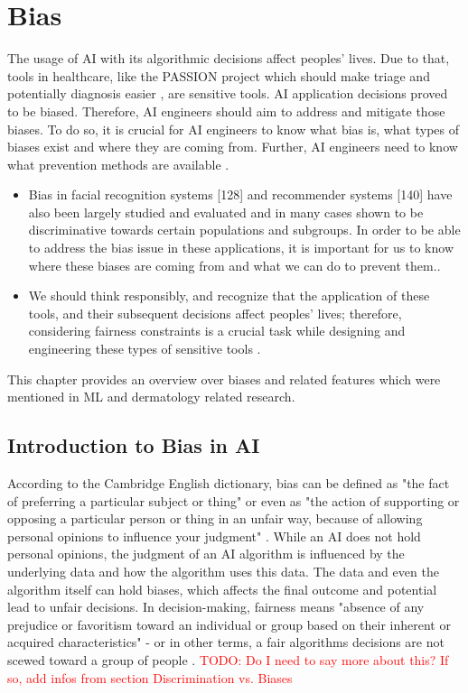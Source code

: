 \documentclass[12pt, a4paper, oneside]{book}   	%
\renewcommand{\todo}[1]{\textcolor{red}{TODO: #1}}
\newif\ifrawcitationactive
\newcommand{\rawcitationusedstart}{\color{violet}}
\newcommand{\rawcitationusedend}{%
	\ifrawcitationactive
	\color{purple}  %
	\else
	\color{black}  %
	\fi
}
\begin{document}
		
		\section{Bias}
		The usage of AI with its algorithmic decisions affect peoples' lives. Due to that, tools in healthcare, like the PASSION project which should make triage and potentially diagnosis easier \autocite{Gottfrois2024}, are sensitive tools. AI application decisions proved to be biased. Therefore, AI engineers should aim to address and mitigate those biases. To do so, it is crucial for AI engineers to know what bias is, what types of biases exist and where they are coming from. Further, AI engineers need to know what prevention methods are available \autocite{Mehrabi_2021}.
			
		\rawcitationusedstart
		\begin{itemize}
			\item Bias in facial recognition systems [128] and recommender systems [140] have also been largely studied and evaluated and in many cases shown to be discriminative towards certain populations and subgroups. In order to be able to address the bias issue in these applications, it is important for us to know where these biases are coming from and what we can do to prevent them.\autocite{Mehrabi_2021}.
			\item We should think responsibly, and recognize that the application of these tools, and their subsequent decisions affect peoples’ lives; therefore, considering fairness constraints is a crucial task while designing and engineering these types of sensitive tools \autocite{Mehrabi_2021}.
		\end{itemize}
		\rawcitationusedend
		
		This chapter provides an overview over biases and related features which were mentioned in ML and dermatology related research.
		
			\subsection{Introduction to Bias in AI}
			According to the Cambridge English dictionary, bias can be defined as "the fact of preferring a particular subject or thing" or even as "the action of supporting or opposing a particular person or thing in an unfair way, because of allowing personal opinions to influence your judgment" \autocite{Cambridge_2025}. While an AI does not hold personal opinions, the judgment of an AI algorithm is influenced by the underlying data and how the algorithm uses this data. The data and even the algorithm itself can hold biases, which affects the final outcome and potential lead to unfair decisions. In decision-making, fairness means "absence of any prejudice or favoritism toward an individual or group based on their inherent or acquired characteristics" - or in other terms, a fair algorithms decisions are not scewed toward a group of people \autocite{Mehrabi_2021}. 
			\todo{Do I need to say more about this? If so, add infos from section Discrimination vs. Biases}
\end{document}
